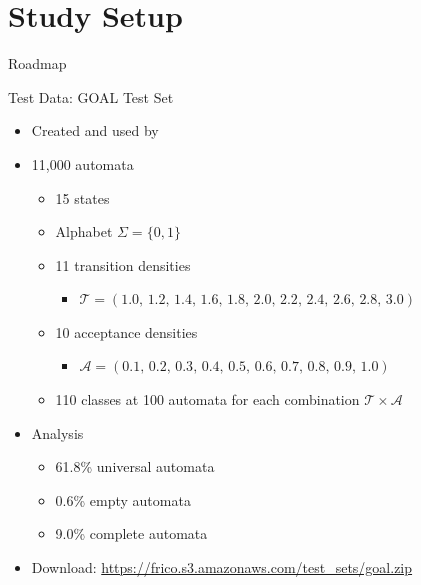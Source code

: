 \documentclass[12pt]{beamer}
\newcommand{\tocstyle}[1]{
\Large
\vspace{0.25cm}
\hspace{0.5cm}
\parbox[top][0.66\textheight][c]{0.66\textwidth}{#1}}
\begin{document}
\section{Study Setup}
\begin{frame}{Roadmap}
\tocstyle{\tableofcontents[currentsection]}
\end{frame}

\begin{frame}{Test Data: GOAL Test Set}
\begin{itemize}
\item Created and used by~\cite{2011_tsai}
\item 11,000 automata
  \begin{itemize}
  \item 15 states
  \item Alphabet $\Sigma = \{0, 1\}$
  \item 11 transition densities
    \begin{itemize}
    \item $\mathcal T=(1.0,\,1.2,\,1.4,\,1.6,\,1.8,\,2.0,\,2.2,\,2.4,\,2.6,\,2.8,\,3.0)$
    \end{itemize}
  \item 10 acceptance densities
    \begin{itemize}
    \item $\mathcal A=(0.1,\,0.2,\,0.3,\,0.4,\,0.5,\,0.6,\,0.7,\,0.8,\,0.9,\,1.0)$
    \end{itemize}
  \item 110 classes at 100 automata for each combination $\mathcal T \times \mathcal A$
  \end{itemize}
\pause
\item Analysis
  \begin{itemize}
  \item 61.8\% universal automata
  \item 0.6\% empty automata
  \item 9.0\% complete automata
  \end{itemize}
\pause
\item Download: \url{https://frico.s3.amazonaws.com/test_sets/goal.zip}
\end{itemize}
\end{frame}
\end{document}
